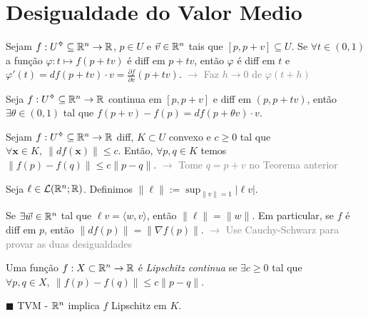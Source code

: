 \section{Desigualdade do Valor Medio} 
\begin{lemma}
    Sejam \(f:U\ab\subseteq \R^n \to \R \), \(p\in U\) e \(\vec{v} \in \mathbb{R}^n\) tais que \([p,p+v]\subseteq U\). Se \(\forall t \in (0,1)\) a função \(\varphi : t \mapsto f(p+tv)\) é diff em \(p+tv\), então \(\varphi\) é diff em \(t\) e \(\varphi{'} (t) = df(p+tv)\cdot v= \frac{\partial f }{\partial v} (p+tv)\). \textcolor{gray}{\(\rightarrow \) Faz \( h\to 0 \) de \(\varphi(t+h)\)}
\end{lemma}


\begin{theorem}
    Seja \(f:U\ab\subseteq \R^n\to \R\) continua em \([p,p+v]\) e diff em \((p, p+tv)\), então \(\exists\theta \in (0,1)\) tal que \(f(p+v)-f(p)= df(p+\theta v )\cdot v \). 
\end{theorem} 

\begin{corollary}
    Sejam \(f: U\ab\subseteq \R^n \to \R\) diff, \(K\subset U\) convexo e \( c\geq 0 \) tal que \(\forall \textbf{x}\in K, \ \|df(\textbf{x})\|\leq c\). Então, \(\forall p,q\in K \) temos  \(\|f(p)-f(q)\|\leq c \|p-q\|\). \textcolor{gray}{\(\rightarrow\) Tome \(q = p+v\) no Teorema anterior} 
\end{corollary}

\newcommand{\Li}{\mathcal{L}}
\begin{definition}
    Seja \(\ell \in \Li(\R^n; \R)\). Definimos \(\displaystyle \|\ell \| := \sup_{\|v\|=1} |\ell v |\).  
\end{definition}

\begin{exercise}
    Se \(\exists \vec{w}\in \mathbb{R}^n\) tal que \(\ell v = \langle w, v \rangle \), então \(\|\ell\| = \|w\|\). Em particular, se \(f\) é diff em \(p\), então \(\|df(p)\|= \|\nabla f (p)\|\). \textcolor{gray}{\(\rightarrow \) Use Cauchy-Schwarz para provar as duas desigualdades} 
\end{exercise}

\begin{definition}
    Uma função \(f:X\subset \mathbb{R}^n\to \mathbb{R} \) é \emph{Lipschitz continua} se \(\exists c\geq 0\) tal que \(\forall p,q \in X, \ \|f(p)-f(q)\|\leq c \|p-q\|\). 
\end{definition}
\begin{corollary}
   \(\blacksquare\) TVM - \(\mathbb{R}^n\) implica \(f\) Lipschitz em \(K\). 
\end{corollary}

\Ei



